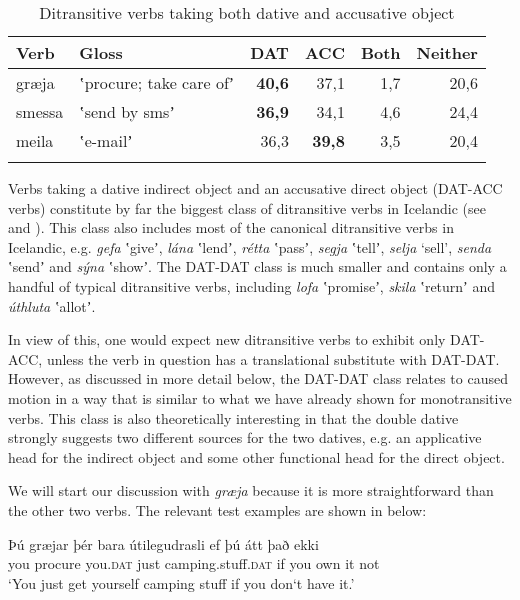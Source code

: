 \documentclass[output=paper,modfonts,nonflat,colorlinks,citecolor=brown]{langsci/langscibook}
\begin{document}
{\begin{table}
{\caption{\label{tab:jonsson:5}Ditransitive verbs taking both dative and accusative object}}
\begin{tabularx}{\textwidth}{XXrrrr}
\lsptoprule
Verb & Gloss & DAT & ACC & Both & Neither\\
\midrule
græja & ʽprocure; take care ofʼ & \textbf{40,6} & 37,1 & 1,7 & 20,6\\
smessa & ʽsend by smsʼ & \textbf{36,9} & 34,1 & 4,6 & 24,4\\
meila & ʽe-mailʼ & 36,3 & \textbf{39,8} & 3,5 & 20,4\\
\lspbottomrule
\end{tabularx}
\end{table}

Verbs taking a dative indirect object and an accusative direct object (DAT-ACC verbs) constitute by far the biggest class of ditransitive verbs in Icelandic (see \citealt{ZaenenMalingThráinsson1985} and \citealt{Jónsson2000}). This class also includes most of the canonical ditransitive verbs in Icelandic, e.g. \textit{gefa} ʽgiveʼ, \textit{lána} ʽlendʼ, \textit{rétta} ʽpassʼ, \textit{segja} ʽtellʼ, \textit{selja} ‘sell’, \textit{senda} ʽsendʼ and \textit{sýna} ʽshowʼ. The DAT-DAT class is much smaller and contains only a handful of typical ditransitive verbs, including \textit{lofa} ʽpromiseʼ, \textit{skila} ʽreturnʼ and \textit{úthluta} ʽallotʼ. 

In view of this, one would expect new ditransitive verbs to exhibit only DAT-ACC, unless the verb in question has a translational substitute with DAT-DAT. However, as discussed in more detail below, the DAT-DAT class relates to caused motion in a way that is similar to what we have already shown for monotransitive verbs. This class is also theoretically interesting in that the double dative strongly suggests two different sources for the two datives, e.g. an applicative head for the indirect object and some other functional head for the direct object. 

We will start our discussion with \textit{græja} because it is more straightforward than the other two verbs. The relevant test examples are shown in  below:

 
\ea%
    \label{ex:jonsson:9}  
\ea
\gll  Þú  græjar  þér  bara  útilegudrasli  ef  þú  átt  það  ekki\\
   you  procure  you.\textsc{dat}  just  camping.stuff.\textsc{dat}  if  you  own  it  not\\
\glt `You just get yourself camping stuff if you don‘t have it.'
 
}
\end{document}
